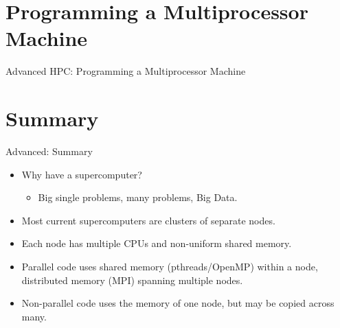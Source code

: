 \section{Programming a Multiprocessor Machine}
\begin{frame}{Advanced HPC: Programming a Multiprocessor Machine}
\end{frame}

\section*{Summary}

\begin{frame}{Advanced: Summary}
  \begin{itemize}
  \item<1->{\alert{Why have a supercomputer?}}
  \begin{itemize}\item<2->{Big single problems, many problems, Big Data.}\end{itemize}
  \item<3->{Most current supercomputers are \alert{clusters} of separate \alert{nodes}.}
  \item<4->{Each node has \alert{multiple CPUs} and \alert{non-uniform shared memory}.}
  \item<5->{\alert{Parallel} code uses shared memory (\alert{pthreads/OpenMP}) within a node, distributed memory (\alert{MPI}) spanning multiple nodes.}
  \item<6->{\alert{Non-parallel} code uses the memory of one node, but may be copied across many.}
  \end{itemize}
  
\end{frame}

